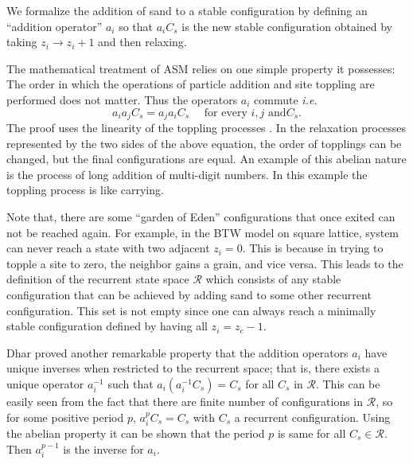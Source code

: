 \documentclass[11pt,a4paper]{book}
\begin{document}
We formalize the addition of sand to a stable configuration by
defining an ``addition operator'' $a_{i}$ so that
$a_{i}C_{s}$ is the new stable configuration obtained by taking
$z_{i}\rightarrow z_{i}+1$ and then relaxing.

The mathematical treatment of ASM relies on one simple property it
possesses: The order in which the operations of particle addition and
site toppling are performed does not matter. Thus the operators
$a_{i}$ commute \textit{i.e.}
\begin{equation}
a_{i}a_{j}C_{s}=a_{j}a_{i}C_{s} \mbox{~ ~  for every $i,j$ and
$C_{s}$}.
\end{equation}
The proof uses the linearity of the toppling processes \cite{dharphysica06}.
In the relaxation processes represented by the two sides of the above
equation, the order of topplings can be changed, but the final
configurations are equal. An example of this abelian nature is the
process of long addition of multi-digit numbers. In this example the
toppling process is like carrying.

%
Note that, there are some ``garden of Eden'' configurations that once
exited can not be reached again. For example, in the
BTW model on square lattice, system can never reach a state with two
adjacent $z_{i}=0$. This is because in trying to topple a site to
zero, the neighbor gains a grain, and vice versa. This leads to the
definition of the recurrent state space $\mathcal{R}$ which consists of any stable
configuration that can be achieved by adding sand to some other
recurrent configuration. This
set is not empty since one can always reach a minimally stable
configuration defined by having all $z_{i}=z_{c}-1$.

Dhar proved \cite{dharprl} another remarkable property that the addition operators
$a_{i}$ have unique inverses when restricted to the recurrent space;
that is, there exists a unique operator $a_{i}^{-1}$ such that
$a_{i}\left (a_{i}^{-1}C_{s}\right )=C_{s}$ for all $C_{s}$ in $\mathcal{R}$.
This can be easily seen from the fact that there are finite number of
configurations in $\mathcal{R}$, so for some positive period
$p$, $a_{i}^{p}C_{s}=C_{s}$ with $C_{s}$ a recurrent configuration.
Using the abelian property it can be shown that the period $p$ is same
for all $C_{s}\in \mathcal{R}$. Then $a_{i}^{p-1}$ is the inverse for
$a_{i}$.
\end{document}
